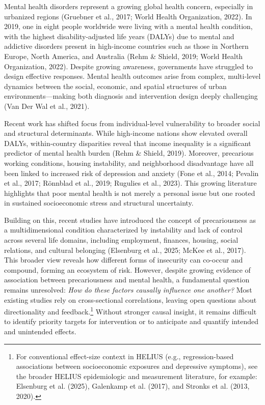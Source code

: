 \documentclass[
]{article}
\begin{document}
Mental health disorders represent a growing global health concern,
especially in urbanized regions (Gruebner et al., 2017; World Health
Organization, 2022). In 2019, one in eight people worldwide were living
with a mental health condition, with the highest disability-adjusted
life years (DALYs) due to mental and addictive disorders present in
high-income countries such as those in Northern Europe, North America,
and Australia (Rehm \& Shield, 2019; World Health Organization, 2022).
Despite growing awareness, governments have struggled to design
effective responses. Mental health outcomes arise from complex,
multi-level dynamics between the social, economic, and spatial
structures of urban environments---making both diagnosis and
intervention design deeply challenging (Van Der Wal et al., 2021).

Recent work has shifted focus from individual-level vulnerability to
broader social and structural determinants. While high-income nations
show elevated overall DALYs, within-country disparities reveal that
income inequality is a significant predictor of mental health burden
(Rehm \& Shield, 2019). Moreover, precarious working conditions, housing
instability, and neighborhood disadvantage have all been linked to
increased risk of depression and anxiety (Fone et al., 2014; Pevalin et
al., 2017; Rönnblad et al., 2019; Rugulies et al., 2023). This growing
literature highlights that poor mental health is not merely a personal
issue but one rooted in sustained socioeconomic stress and structural
uncertainty.

Building on this, recent studies have introduced the concept of
precariousness as a multidimensional condition characterized by
instability and lack of control across several life domains, including
employment, finances, housing, social relations, and cultural belonging
(Elsenburg et al., 2025; McKee et al., 2017). This broader view reveals
how different forms of insecurity can co-occur and compound, forming an
ecosystem of risk. However, despite growing evidence of association
between precariousness and mental health, a fundamental question remains
unresolved: \emph{How do these factors causally influence one another?}
Most existing studies rely on cross-sectional correlations, leaving open
questions about directionality and
feedback.\footnote{For conventional effect-size context in HELIUS (e.g., regression-based associations between socioeconomic exposures and depressive symptoms), see the broader HELIUS epidemiologic and measurement literature, for example: Elsenburg et al. (2025), Galenkamp et al. (2017), and Stronks et al. (2013, 2020).}
Without stronger causal insight, it remains difficult to identify
priority targets for intervention or to anticipate and quantify intended
and unintended effects.
\end{document}
